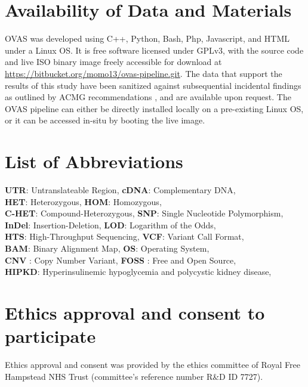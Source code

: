 \documentclass[twocolumn]{bmcart}%
\def\app{OVAS}
\begin{document}
\begin{backmatter}

\section*{Availability of Data and Materials}
\app{} was developed using C++, Python, Bash, Php, Javascript, and HTML under a Linux OS. It is free software licensed under GPLv3, with the source code and live ISO binary image freely accessible for download at \url{https://bitbucket.org/momo13/ovas-pipeline.git}. The data that support the results of this study have been sanitized against subsequential incidental findings as outlined by ACMG recommendations \cite{kalia2016recommendations}, and are available upon request. The \app{} pipeline can either be directly installed locally on a pre-existing Linux OS, or it can be accessed in-situ by booting the live image.

\section*{List of Abbreviations}
\textbf{UTR}:  Untranslateable Region, \textbf{cDNA}: Complementary DNA,\\
\textbf{HET}: Heterozygous, \textbf{HOM}: Homozygous,\\
\textbf{C-HET}: Compound-Heterozygous, \textbf{SNP}: Single Nucleotide Polymorphism,\\
\textbf{InDel}: Insertion-Deletion, \textbf{LOD}: Logarithm of the Odds,\\
\textbf{HTS}: High-Throughput Sequencing, \textbf{VCF}: Variant Call Format,\\
\textbf{BAM}: Binary Alignment Map, \textbf{OS}: Operating System,\\
\textbf{CNV} : Copy Number Variant, \textbf{FOSS} : Free and Open Source,\\
\textbf{HIPKD}: Hyperinsulinemic hypoglycemia and polycystic kidney disease,\\

\section*{Ethics approval and consent to participate}
Ethics approval and consent was provided by the ethics committee of Royal Free Hampstead NHS Trust (committee's reference number R\&D ID 7727).


\end{backmatter}
\end{document}
